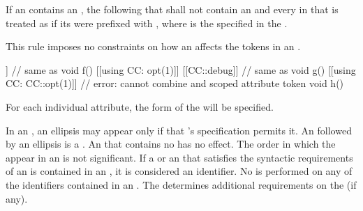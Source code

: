 \pnum
If an 
contains an ,
the  following that 
shall not contain an 
and every  in that 
is treated as if
its  were prefixed with ,
where  is the 
specified in the .
\begin{note}
This rule imposes no constraints on how
an 
affects the tokens in an .
\end{note}
\begin{example}
\begin{codeblock}
[[using CC: opt(1), debug]]         // same as 
  void f() {}
[[using CC: opt(1)]] [[CC::debug]]  // same as \tcode{[[CC::opt(1)]] [[CC::debug]]}
  void g() {}
[[using CC: CC::opt(1)]]            // error: cannot combine  and scoped attribute token
  void h() {}
\end{codeblock}
\end{example}

\pnum
\begin{note}
For each individual attribute, the form of the
 will be specified.
\end{note}

\pnum
In an , an ellipsis may appear only if that
's specification permits it. An  followed
by an ellipsis is a .
An  that contains no  has no
effect. The order in which the  appear in an
 is not significant. If a
or an  that satisfies the syntactic requirements
of an  is
contained in
an , it is considered an identifier. No
 is performed on any of the identifiers contained in an
. The  determines additional
requirements on the  (if any).

